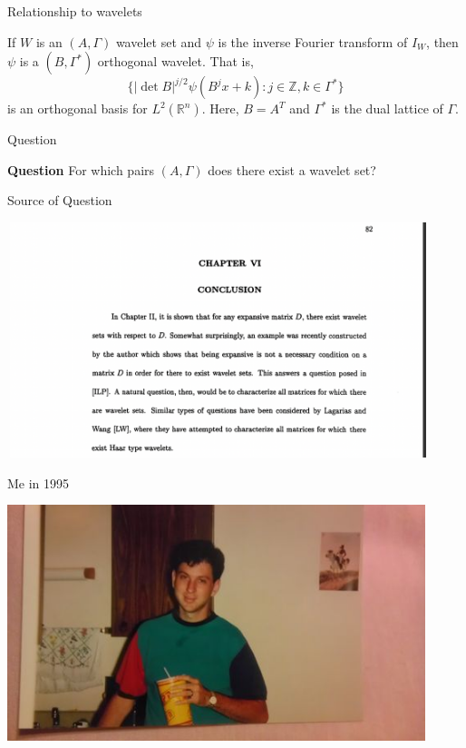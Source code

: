 \documentclass{sintefbeamer}
\newcommand{\Z}{{\mathbb {Z}}}
\newcommand{\R}{{\mathbb {R}}}
\begin{document}
\begin{frame}{Relationship to wavelets}

 If $W$ is an $(A, \Gamma)$ wavelet set and $\psi$ is the inverse Fourier transform of $I_W$, then $\psi$ is a $(B, \Gamma^*)$ orthogonal wavelet. That is,
    \[
    \{|\det B|^{j/2} \psi(B^j x + k): j\in \Z, k \in \Gamma^*\}
    \]
    is an orthogonal basis for $L^2(\R^n)$. Here, $B = A^T$ and $\Gamma^*$ is the dual lattice of $\Gamma$.
    
\end{frame}

\begin{frame}{Question}

{\bf{Question}} For which pairs $(A, \Gamma)$ does there exist a wavelet set?

    
\end{frame}

\begin{frame}{Source of Question}

\includegraphics[width=123mm,height = 2.7in]{images/thesis_question.png}
    
\end{frame}

\begin{frame}{Me in 1995}

    \includegraphics[width=\linewidth,height=2.7in]{images/default.jpg}

\end{frame}
\end{document}
